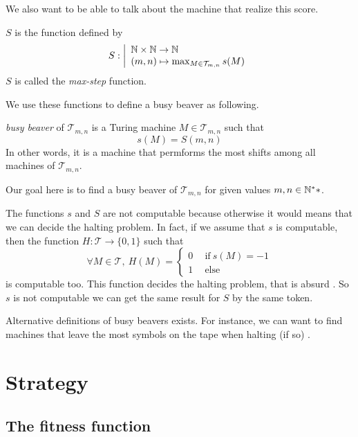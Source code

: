 \documentclass{report}
\begin{document}
We also want to be able to talk about the machine that realize this score.
\begin{Def}
$S$ is the function defined by
\[
S : \left |
  \begin{array}{l}
    \mathbb{N} \times \mathbb{N} \to \mathbb{N}\\
    (m,n) \mapsto \max_{M \in \mathcal{T}_{m,n}} s(M)
  \end{array}
\right .
\]
$S$ is called the \emph{max-step} function.
\end{Def}

We use these functions to define a busy beaver as following.

\begin{Def}
\emph{busy beaver} of $\mathcal{T}_{m,n}$ is a Turing machine $M \in \mathcal{T}_{m,n}$ such that \[s(M) = S(m,n)\] In other words, it is a machine that permforms the most shifts among all machines of $\mathcal{T}_{m,n}$. 
\end{Def}


Our goal here is to find a busy beaver of $\mathcal{T}_{m,n}$ for given values $m,n\in\mathbb{N}^**$.


\begin{Rem}
  The functions $s$ and $S$ are not computable because otherwise it would means that we can decide the halting problem. In fact, if we assume that $s$ is computable, then the function $H : \mathcal{T} \to \{0,1\}$ such that
  \[
  \forall M \in \mathcal{T},\ H(M) =
  \left \{
    \begin{array}{l}
      0\quad \ \text{if}\ s(M) = -1\\
      1\quad \ \text{else}
    \end{array}
  \right .
  \]
  is computable too. This function decides the halting problem, that is absurd \cite{turing}. So $s$ is not computable we can get the same result for $S$ by the same token.
\end{Rem}

\begin{Rem}
  Alternative definitions of busy beavers exists. For instance, we can want to find machines that leave the most symbols on the tape when halting (if so) \cite{rado}.
\end{Rem}

\chapter{Strategy}
\label{chap:strategy}

\section{The fitness function}
\label{sec:fitness}
\end{document}
